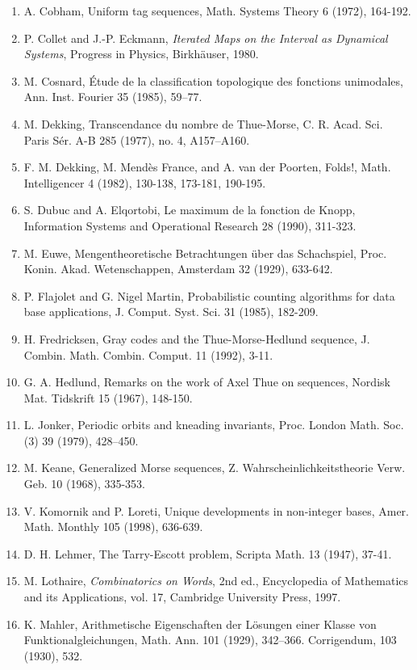 \documentclass[10pt]{article}
\begin{document}
\begin{enumerate}
  \item A. Cobham, Uniform tag sequences, Math. Systems Theory 6 (1972), 164-192.
  \item P. Collet and J.-P. Eckmann, \emph{Iterated Maps on the Interval as Dynamical Systems}, Progress in Physics, Birkhäuser, 1980.
  \item M. Cosnard, Étude de la classification topologique des fonctions unimodales, Ann. Inst. Fourier 35 (1985), 59--77.
  \item M. Dekking, Transcendance du nombre de Thue-Morse, C. R. Acad. Sci. Paris Sér. A-B 285 (1977), no. 4, A157--A160.
  \item F. M. Dekking, M. Mendès France, and A. van der Poorten, Folds!, Math. Intelligencer 4 (1982), 130-138, 173-181, 190-195.
  \item S. Dubuc and A. Elqortobi, Le maximum de la fonction de Knopp, Information Systems and Operational Research 28 (1990), 311-323.
  \item M. Euwe, Mengentheoretische Betrachtungen über das Schachspiel, Proc. Konin. Akad. Wetenschappen, Amsterdam 32 (1929), 633-642.
  \item P. Flajolet and G. Nigel Martin, Probabilistic counting algorithms for data base applications, J. Comput. Syst. Sci. 31 (1985), 182-209.
  \item H. Fredricksen, Gray codes and the Thue-Morse-Hedlund sequence, J. Combin. Math. Combin. Comput. 11 (1992), 3-11.
  \item G. A. Hedlund, Remarks on the work of Axel Thue on sequences, Nordisk Mat. Tidskrift 15 (1967), 148-150.
  \item L. Jonker, Periodic orbits and kneading invariants, Proc. London Math. Soc. (3) 39 (1979), 428--450.
  \item M. Keane, Generalized Morse sequences, Z. Wahrscheinlichkeitstheorie Verw. Geb. 10 (1968), 335-353.
  \item V. Komornik and P. Loreti, Unique developments in non-integer bases, Amer. Math. Monthly 105 (1998), 636-639.
  \item D. H. Lehmer, The Tarry-Escott problem, Scripta Math. 13 (1947), 37-41.
  \item M. Lothaire, \emph{Combinatorics on Words}, 2nd ed., Encyclopedia of Mathematics and its Applications, vol. 17, Cambridge University Press, 1997.
  \item K. Mahler, Arithmetische Eigenschaften der Lösungen einer Klasse von Funktionalgleichungen, Math. Ann. 101 (1929), 342--366. Corrigendum, 103 (1930), 532.

\end{enumerate}
\end{document}
